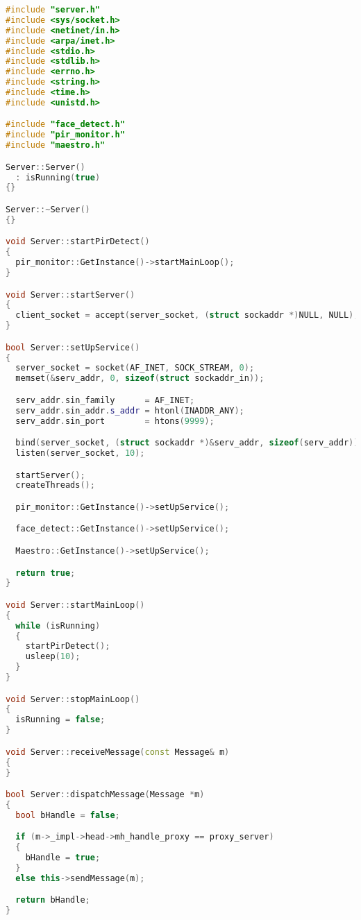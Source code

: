 \begin{lstlisting}[caption=server.cpp,language=C++]
#include "server.h"
#include <sys/socket.h>
#include <netinet/in.h>
#include <arpa/inet.h>
#include <stdio.h>
#include <stdlib.h>
#include <errno.h>
#include <string.h>
#include <time.h>
#include <unistd.h>

#include "face_detect.h"
#include "pir_monitor.h"
#include "maestro.h"

Server::Server()
  : isRunning(true)
{}

Server::~Server()
{}

void Server::startPirDetect()
{
  pir_monitor::GetInstance()->startMainLoop();
}

void Server::startServer()
{
  client_socket = accept(server_socket, (struct sockaddr *)NULL, NULL);
}

bool Server::setUpService()
{
  server_socket = socket(AF_INET, SOCK_STREAM, 0);
  memset(&serv_addr, 0, sizeof(struct sockaddr_in));

  serv_addr.sin_family      = AF_INET;
  serv_addr.sin_addr.s_addr = htonl(INADDR_ANY);
  serv_addr.sin_port        = htons(9999);

  bind(server_socket, (struct sockaddr *)&serv_addr, sizeof(serv_addr));
  listen(server_socket, 10);

  startServer();
  createThreads();

  pir_monitor::GetInstance()->setUpService();

  face_detect::GetInstance()->setUpService();

  Maestro::GetInstance()->setUpService();

  return true;
}

void Server::startMainLoop()
{
  while (isRunning)
  {
    startPirDetect();
    usleep(10);
  }
}

void Server::stopMainLoop()
{
  isRunning = false;
}

void Server::receiveMessage(const Message& m)
{
}

bool Server::dispatchMessage(Message *m)
{
  bool bHandle = false;

  if (m->_impl->head->mh_handle_proxy == proxy_server)
  {
    bHandle = true;
  }
  else this->sendMessage(m);

  return bHandle;
}

\end{lstlisting}






